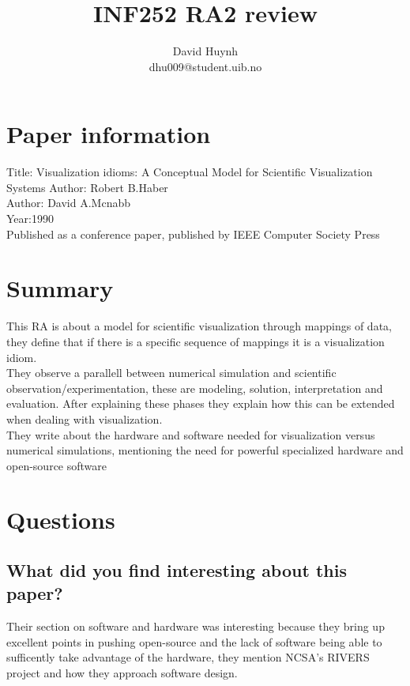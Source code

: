\documentclass{article}
\begin{document}
\title{INF252 RA2 review}
\author{David Huynh\\dhu009@student.uib.no}
\date{}

\maketitle

\section{Paper information}
Title: Visualization idioms: A Conceptual Model for Scientific Visualization Systems
Author: Robert B.Haber\\
Author: David A.Mcnabb\\
Year:1990\\
Published as a conference paper, published by IEEE Computer Society Press

\section{Summary}

This RA is about a model for scientific visualization through mappings of data, they define that if there is a specific sequence of mappings it is a visualization idiom.\\
They observe a parallell between numerical simulation and scientific observation/experimentation, these are modeling, solution, interpretation and evaluation. After explaining these phases they explain how this can be extended when dealing with visualization.\\
They write about the hardware and software needed for visualization versus numerical simulations, mentioning the need for powerful specialized hardware and open-source software

\section{Questions}

\subsection*{What did you find interesting about this paper?}

Their section on software and hardware was interesting because they bring up excellent points in pushing open-source and the lack of software being able to sufficently take advantage of the hardware, they mention NCSA's RIVERS project and how they approach software design.
\end{document}
